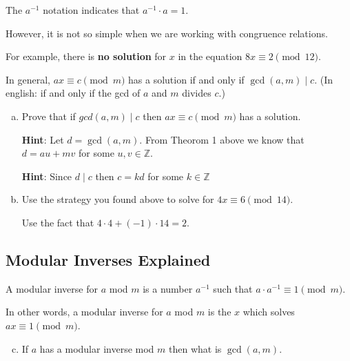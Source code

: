\documentclass[12pt,letterpaper]{article}
\newcommand\Z{\mathbb Z}
\newcommand\hint[1]{\textbf{Hint}: #1}
\begin{document}
	The $a^{-1}$ notation indicates that $a^{-1}\cdot a = 1$. 

	However, it is not so simple when we are working with congruence relations.

	For example, there is \textbf{no solution} for $x$ in the equation $8x \equiv 2 \pmod{12}$. 

	In general, $ax \equiv c \pmod{m}$ has a solution if and only if $\gcd(a,m) \mid c$. (In english: if and only if the gcd of $a$ and $m$ divides $c$.)

	\begin{enumerate}[a.]
		\item Prove that if $gcd(a,m) \mid c$ then  $ax \equiv c \pmod{m}$ has a solution.
		
		\hint{Let $d = \gcd(a,m)$. From Theorom 1 above we know that $d = au + mv$ for some $u,v\in \Z$.}

		\hint{Since $d \mid c$ then $c = kd$ for some $k \in \Z$}

		\begin{mdframed}
			\vspace{10cm}
		\end{mdframed}

		\item Use the strategy you found above to solve for $4x \equiv 6 \pmod{14}$. 

Use the fact that $4\cdot 4 + (-1)\cdot 14 = 2$.

		\begin{mdframed}
			\vspace{6cm}
		\end{mdframed}
		
	\end{enumerate}

		\subsection*{Modular Inverses Explained}

		A modular inverse for $a$ mod $m$ is a number $a^{-1}$ such that $a \cdot a^{-1} \equiv 1 \pmod{m}$.

		In other words, a modular inverse for $a$ mod $m$ is the $x$ which solves $ax \equiv 1 \pmod{m}$.

		\begin{enumerate}[a.]
		\setcounter{enumi}{2}
			\item If $a$ has a modular inverse mod $m$ then what is $\gcd(a,m)$.
			\begin{mdframed}
			\vspace{1cm}
			\end{mdframed}

		\end{enumerate}
\end{document}
